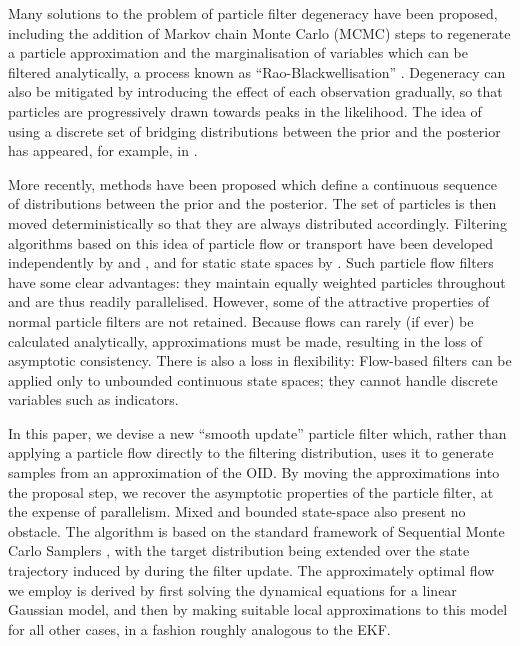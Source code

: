 \documentclass[a4paper,10pt]{article}
\begin{document}
Many solutions to the problem of particle filter degeneracy have been proposed, including the addition of Markov chain Monte Carlo (MCMC) steps to regenerate a particle approximation \cite{Gilks2001} and the marginalisation of variables which can be filtered analytically, a process known as ``Rao-Blackwellisation'' \cite{Casella1996,Doucet2000}. Degeneracy can also be mitigated by introducing the effect of each observation gradually, so that particles are progressively drawn towards peaks in the likelihood. The idea of using a discrete set of bridging distributions between the prior and the posterior has appeared, for example, in \cite{Godsill2001b}.

More recently, methods have been proposed which define a continuous sequence of distributions between the prior and the posterior. The set of particles is then moved deterministically so that they are always distributed accordingly. Filtering algorithms based on this idea of particle flow or transport have been developed independently by \cite{Daum2008,Daum2011d} and \cite{Reich2011}, and for static state spaces by \cite{Moselhy2012}. Such particle flow filters have some clear advantages: they maintain equally weighted particles throughout and are thus readily parallelised. However, some of the attractive properties of normal particle filters are not retained. Because flows can rarely (if ever) be calculated analytically, approximations must be made, resulting in the loss of asymptotic consistency. There is also a loss in flexibility: Flow-based filters can be applied only to unbounded continuous state spaces; they cannot handle discrete variables such as indicators.

In this paper, we devise a new ``smooth update'' particle filter which, rather than applying a particle flow directly to the filtering distribution, uses it to generate samples from an approximation of the OID. By moving the approximations into the proposal step, we recover the asymptotic properties of the particle filter, at the expense of parallelism. Mixed and bounded state-space also present no obstacle. The algorithm is based on the standard framework of Sequential Monte Carlo Samplers \cite{DelMoral2006}, with the target distribution being extended over the state trajectory induced by during the filter update. The approximately optimal flow we employ is derived by first solving the dynamical equations for a linear Gaussian model, and then by making suitable local approximations to this model for all other cases, in a fashion roughly analogous to the EKF.
\end{document}
